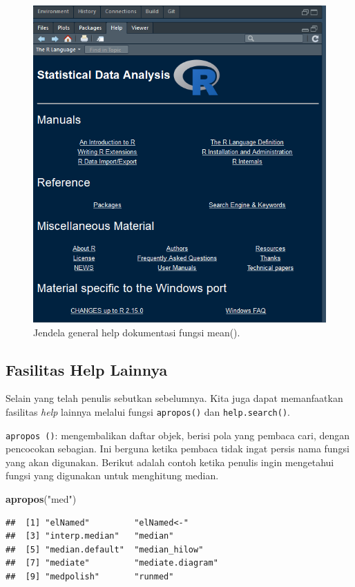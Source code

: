 \documentclass[]{book}
\newenvironment{Shaded}{\begin{snugshade}}{\end{snugshade}}
\newcommand{\KeywordTok}[1]{\textcolor[rgb]{0.13,0.29,0.53}{\textbf{#1}}}
\newcommand{\StringTok}[1]{\textcolor[rgb]{0.31,0.60,0.02}{#1}}
\newcommand{\NormalTok}[1]{#1}
\begin{document}
\begin{figure}

{\centering \includegraphics[width=0.5\linewidth]{generalhelp} 

}

\caption{Jendela general help dokumentasi fungsi mean().}\label{fig:generalhelp}
\end{figure}

\subsection{Fasilitas Help Lainnya}\label{fasilitas-help-lainnya}

Selain yang telah penulis sebutkan sebelumnya. Kita juga dapat
memanfaatkan fasilitas \emph{help} lainnya melalui fungsi
\texttt{apropos()} dan \texttt{help.search()}.

\texttt{apropos\ ()}: mengembalikan daftar objek, berisi pola yang
pembaca cari, dengan pencocokan sebagian. Ini berguna ketika pembaca
tidak ingat persis nama fungsi yang akan digunakan. Berikut adalah
contoh ketika penulis ingin mengetahui fungsi yang digunakan untuk
menghitung median.

\begin{Shaded}
\begin{Highlighting}[]
\KeywordTok{apropos}\NormalTok{(}\StringTok{"med"}\NormalTok{)}
\end{Highlighting}
\end{Shaded}

\begin{verbatim}
##  [1] "elNamed"         "elNamed<-"      
##  [3] "interp.median"   "median"         
##  [5] "median.default"  "median_hilow"   
##  [7] "mediate"         "mediate.diagram"
##  [9] "medpolish"       "runmed"
\end{verbatim}
\end{document}
